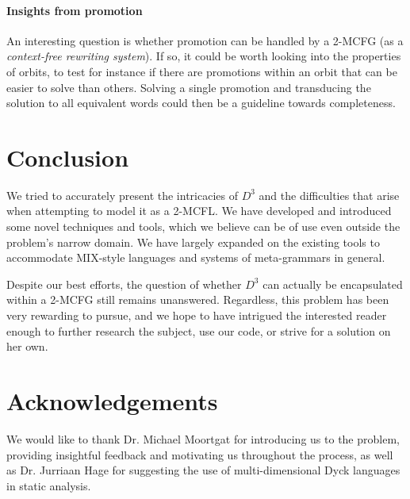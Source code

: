 \documentclass{llncs}
\begin{document}
\paragraph{\textbf{Insights from promotion}}
An interesting question is whether promotion can be handled by a 2-MCFG (as a \textit{context-free rewriting system}). If so, it could be worth looking into the properties of orbits, to test for instance if there are promotions within an orbit that can be easier to solve than others. Solving a single promotion and transducing the solution to all equivalent words could then be a guideline towards completeness. 

\section{Conclusion}
We tried to accurately present the intricacies of $D^3$ and the difficulties that arise when attempting to model it as a 2-MCFL. We have developed and introduced some novel techniques and tools, which we believe can be of use even outside the problem's narrow domain. We have largely expanded on the existing tools to accommodate MIX-style languages and systems of meta-grammars in general.

Despite our best efforts, the question of whether $D^3$ can actually be encapsulated within a 2-MCFG still remains unanswered. Regardless, this problem has been very rewarding to pursue, and we hope to have intrigued the interested reader enough to further research the subject, use our code, or strive for a solution on her own.

\section*{Acknowledgements}
We would like to thank Dr. Michael Moortgat for introducing us to the problem, providing insightful feedback and motivating us throughout the process, as well as Dr. Jurriaan Hage for suggesting the use of multi-dimensional Dyck languages in static analysis.
\end{document}
